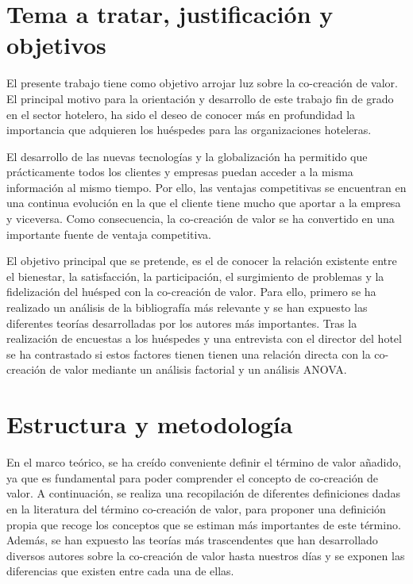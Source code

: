 \section{Tema a tratar, justificación y objetivos}

El presente trabajo tiene como objetivo arrojar luz sobre la co-creación de valor. El principal motivo para la orientación y desarrollo de este trabajo fin de grado en el sector hotelero, ha sido el deseo de conocer más en profundidad la importancia que adquieren los huéspedes para las organizaciones hoteleras.

El desarrollo de las nuevas tecnologías y la globalización ha permitido que prácticamente todos los clientes y empresas puedan acceder a la misma información al mismo tiempo. Por ello, las ventajas competitivas se encuentran en una continua evolución en la que el cliente tiene mucho que aportar a la empresa y viceversa. Como consecuencia, la co-creación de valor se ha convertido en una importante fuente de ventaja competitiva.

El objetivo principal que se pretende, es el de conocer la relación existente entre el bienestar, la satisfacción, la participación, el surgimiento de problemas y la fidelización del huésped con la co-creación de valor. Para ello, primero se ha realizado un análisis de la bibliografía más relevante y se han expuesto las diferentes teorías desarrolladas por los autores más importantes. Tras la realización de encuestas a los huéspedes y una entrevista con el director del hotel se ha contrastado si estos factores tienen tienen una relación directa con la co-creación de valor mediante un análisis factorial y un análisis ANOVA.

\section{Estructura y metodología}

En el marco teórico, se ha creído conveniente definir el término de valor añadido, ya que es fundamental para poder comprender el concepto de co-creación de valor. A continuación, se realiza una recopilación de diferentes definiciones dadas en la literatura del término co-creación de valor, para proponer una definición propia que recoge los conceptos que se estiman más importantes de este término. Además, se han expuesto las teorías más trascendentes que han desarrollado diversos autores sobre la co-creación de valor hasta nuestros días y se exponen las diferencias que existen entre cada una de ellas.

